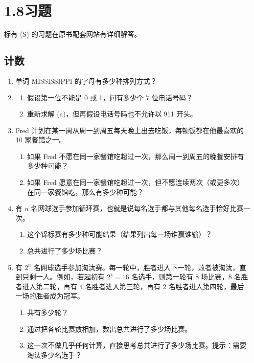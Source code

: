 \documentclass[UTF8,12pt,a4paper,fontset=fandol]{ctexart}
\begin{document}
\section*{1.8\quad 习题}

标有 (S) 的习题在原书配套网站有详细解答。

\subsection*{计数}

\begin{enumerate}
  \item 单词 MISSISSIPPI 的字母有多少种排列方式？

  \item
  \begin{enumerate}
    \item 假设第一位不能是 0 或 1，问有多少个 7 位电话号码？
    \item 重新求解 (a)，但再假设电话号码也不允许以 911 开头。
  \end{enumerate}

  \item Fred 计划在某一周从周一到周五每天晚上出去吃饭，每顿饭都在他最喜欢的 10 家餐馆之一。
  \begin{enumerate}
    \item 如果 Fred 不愿在同一家餐馆吃超过一次，那么周一到周五的晚餐安排有多少种可能？
    \item 如果 Fred 愿意在同一家餐馆吃超过一次，但不愿连续两次（或更多次）在同一家餐馆吃，那么有多少种可能？
  \end{enumerate}

  \item 有 $n$ 名网球选手参加循环赛，也就是说每名选手都与其他每名选手恰好比赛一次。
  \begin{enumerate}
    \item 这个锦标赛有多少种可能结果（结果列出每一场谁赢谁输）？
    \item 总共进行了多少场比赛？
  \end{enumerate}

  \item 有 $2^n$ 名网球选手参加淘汰赛。每一轮中，胜者进入下一轮，败者被淘汰，直到只剩一人。例如，若起初有 $2^4=16$ 名选手，则第一轮有 8 场比赛，8 名胜者进入第二轮，再有 4 名胜者进入第三轮，再有 2 名胜者进入第四轮，最后一场的胜者成为冠军。
  \begin{enumerate}
    \item 共有多少轮？
    \item 通过把各轮比赛数相加，数出总共进行了多少场比赛。
    \item 这一次不做几乎任何计算，直接思考总共进行了多少场比赛。提示：需要淘汰多少名选手？
  \end{enumerate}


\end{enumerate}
\end{document}
